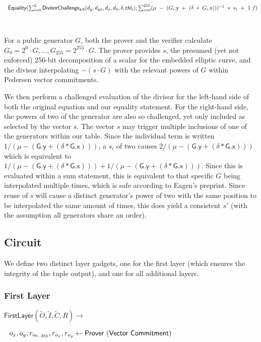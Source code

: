 \documentclass[]{article}
\begin{document}
$~~\mathsf{Equality}(\sum^2_{i=0} \mathsf{DivisorChallenge_{a,b}}(d_y, d_{yx}, d_x, d_0, \delta, \mathsf{chl}_i), \sum^{255}_{i=0} (\mu ~-~ (G_i\mathsf{.y} ~+~ (\delta ~*~ G_i\mathsf{.x})))^{-1} ~*~ s_i ~+~ 1 ~f)$

\

For a public generator $G$, both the prover and the verifier calculate $G_0 = 2^0 \cdot G, ..., G_{255} = 2^{255} \cdot G$. The prover provides $s$, the presumed (yet not enforced) 256-bit decomposition of a scalar for the embedded elliptic curve, and the divisor interpolating $-(s \cdot G)$ with the relevant powers of $G$ within Pedersen vector commitments.

We then perform a challenged evaluation of the divisor for the left-hand side of both the original equation and our equality statement. For the right-hand side, the powers of two of the generator are also so challenged, yet only included as selected by the vector $s$. The vector $s$ may trigger multiple inclusions of one of the generators within our table. Since the individual term is written $1 / (\mu - (\mathsf{G.y} + (\delta * \mathsf{G.x})))$, a $s_i$ of two causes $2 / (\mu - (\mathsf{G.y} + (\delta * \mathsf{G.x})))$ which is equivalent to $1 / (\mu - (\mathsf{G.y} + (\delta * \mathsf{G.x}))) + 1 / (\mu - (\mathsf{G.y} + (\delta * \mathsf{G.x})))$. Since this is evaluated within a sum statement, this is equivalent to that specific $G$ being interpolated multiple times, which is safe according to Eagen's preprint. Since reuse of $s$ will cause a distinct generator's power of two with the same position to be interpolated the same amount of times, this does yield a consistent $s'$ (with the assumption all generators share an order).

\newpage

\subsection{Circuit}

We define two distinct layer gadgets, one for the first layer (which ensures the integrity of the tuple output), and one for all additional layers.

\subsubsection{First Layer}

$\mathsf{FirstLayer}(\tilde{O}, \tilde{I}, \tilde{C}, R) \rightarrow$

$~~o_x, o_y, r_{o_{0..255}}, r_{o_x}, r_{o_y}\leftarrow \mathsf{Prover ~(Vector ~Commitment)}$
\end{document}
